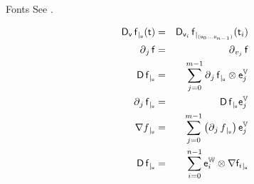 \documentclass{PalisadesLakesArticle}
\begin{document}
\begin{plSection}{Fonts}
See 
.


\begin{eqnarray}
\Derivative[\Vector{v}]{\Vector{f}}[\Vector{u}][\Vector{t}]
& = &
\Derivative[\Vector{v}_i]{\Vector{f}}
[(\Vector{u}_0 \ldots \Vector{u}_{n-1})][\Vector{t}_i] 
\\
\Partial{j}{\Vector{f}} & = &\Partial{v_j}{\Vector{f}} 
\\
\Derivative{\Vector{f}}[\Vector{u}]
& = &
\sum_{j=0}^{m-1} \Partial{j}{\Vector{f}}[\Vector{u}] 
\otimes \Vector{e}_j^{\Space{V}}
\\
\Partial{j}{\Vector{f}}[\Vector{u}]
& = &
\Derivative{\Vector{f}}[\Vector{u}] \Vector{e}_j^{\Space{V}}
\\
\Gradient{f}[\Vector{u}] 
& = &
\sum_{j=0}^{m-1} 
\left( 
\Partial{j}{f}[\Vector{u}] 
\right) \Vector{e}_j^{\Space{V}}
\\
\Derivative{\Vector{f}}[\Vector{u}]
& = &
 \sum_{i=0}^{n-1}  
\Vector{e}_i^{\Space{W}} 
\otimes \Gradient{\Vector{f}_i}[\Vector{u}]
\end{eqnarray}
\end{plSection}%
\end{document}
